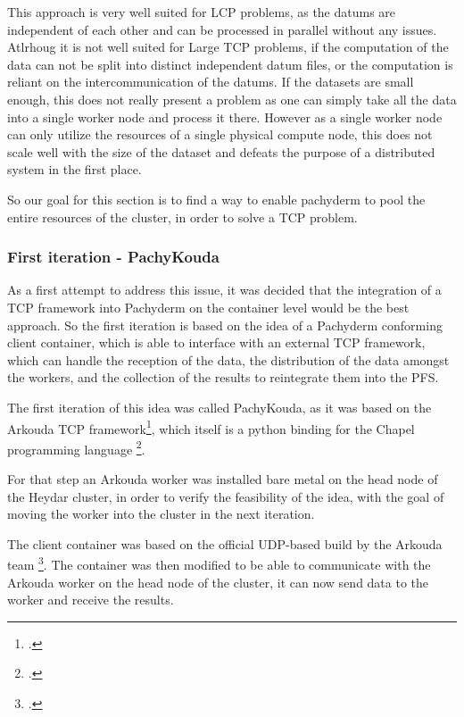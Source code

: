 This approach is very well suited for \ac{LCP} problems, as the datums are independent of each other and can be processed in parallel without any issues.
Atlrhoug it is not well suited for Large \ac{TCP} problems, if the computation of the data can not be split into distinct independent datum files, or the computation is reliant on the intercommunication of the datums.
If the datasets are small enough, this does not really present a problem as one can simply take all the data into a single worker node and process it there.
However as a single worker node can only utilize the resources of a single physical compute node, this does not scale well with the size of the dataset and defeats the purpose of a distributed system in the first place.

So our goal for this section is to find a way to enable pachyderm to pool the entire resources of the cluster, in order to solve a \ac{TCP} problem.

\subsubsection{First iteration - PachyKouda}

As a first attempt to address this issue, it was decided that the integration of a \ac{TCP} framework into Pachyderm on the container level would be the best approach.
So the first iteration is based on the idea of a Pachyderm conforming client container, which is able to interface with an external \ac{TCP} framework,
which can handle the reception of the data, the distribution of the data amongst the workers, and the collection of the results to reintegrate them into the \ac{PFS}.

The first iteration of this idea was called PachyKouda, as it was based on the Arkouda \ac{TCP} framework\footcite{ArkoudaGituhbRepository2023},
which itself is a python binding for the Chapel programming language \footcite{ChapellangChapelProductive}. 

For that step an Arkouda worker was installed bare metal on the head node of the Heydar cluster, in order to verify the feasibility of the idea,
with the goal of moving the worker into the cluster in the next iteration.

The client container was based on the official \ac{UDP}-based build by the Arkouda team \footcite{ArkoudacontribArkoudadockerMain}.
The container was then modified to be able to communicate with the Arkouda worker on the head node of the cluster, it can now send data to the worker and receive the results.

